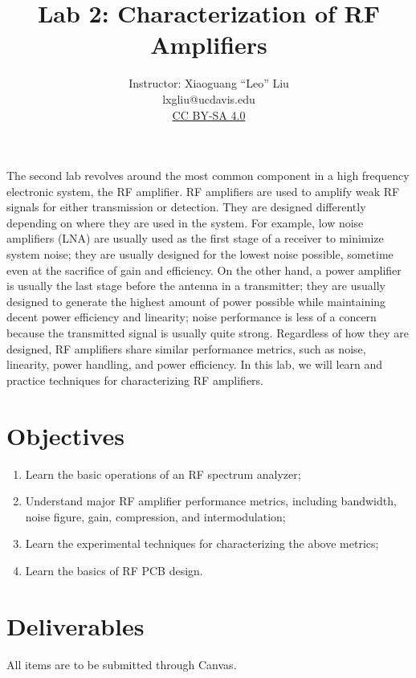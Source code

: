 \documentclass[letterpaper, 11pt]{article}
\begin{document}
\title{Lab 2: Characterization of RF Amplifiers}
\author{Instructor: Xiaoguang ``Leo'' Liu\\lxgliu@ucdavis.edu \\
	\small \href{http://creativecommons.org/licenses/by-sa/4.0/}{CC BY-SA 4.0}}
\date{}

\maketitle

The second lab revolves around the most common component in a high frequency electronic system, the RF amplifier. RF amplifiers are used to amplify weak RF signals for either transmission or detection. They are designed differently depending on where they are used in the system. For example, low noise amplifiers (LNA) are usually used as the first stage of a receiver to minimize system noise; they are usually designed for the lowest noise possible, sometime even at the sacrifice of gain and efficiency. On the other hand, a power amplifier is usually the last stage before the antenna in a transmitter; they are usually designed to generate the highest amount of power possible while maintaining decent power efficiency and linearity; noise performance is less of a concern because the transmitted signal is usually quite strong. Regardless of how they are designed, RF amplifiers share similar performance metrics, such as noise, linearity, power handling, and power efficiency. In this lab, we will learn and practice techniques for characterizing RF amplifiers. 

\section{Objectives}

\begin{enumerate}[itemsep=0.1ex]
	\item Learn the basic operations of an RF spectrum analyzer;
	\item Understand major RF amplifier performance metrics, including bandwidth, noise figure, gain, compression, and intermodulation;
	\item Learn the experimental techniques for characterizing the above metrics;
	\item Learn the basics of RF PCB design. 
\end{enumerate}

\newpage
\section{Deliverables}
All items are to be submitted through Canvas.  
\end{document}
